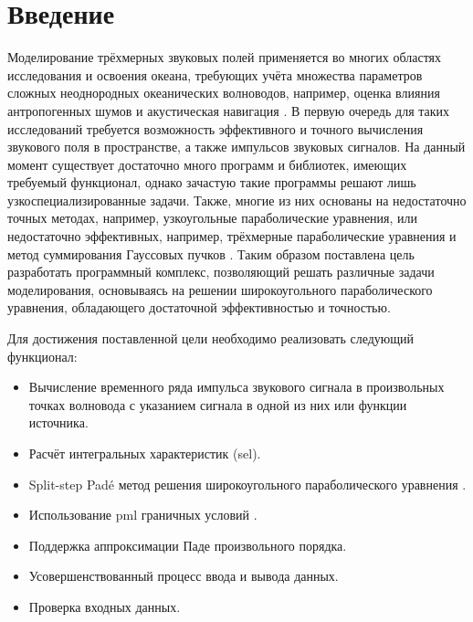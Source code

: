 \documentclass[../document.tex]{subfiles}
\begin{document}
	\section*{Введение}
	    \par Моделирование трёхмерных звуковых полей применяется во многих областях исследования и освоения океана, требующих учёта множества параметров сложных неоднородных океанических волноводов, например, оценка влияния антропогенных шумов и акустическая навигация \cite{noise1, noise2, navigation19, navigation20}. В первую очередь для таких исследований требуется возможность эффективного и точного вычисления звукового поля в пространстве, а также импульсов звуковых сигналов. На данный момент существует достаточно много программ и библиотек, имеющих требуемый функционал, однако зачастую такие программы решают лишь узкоспециализированные задачи. Также, многие из них основаны на недостаточно точных методах, например, узкоугольные параболические уравнения, или недостаточно эффективных, например, трёхмерные параболические уравнения \cite{isakson14,lin12,shtrum16,whoi,lyon} и метод суммирования Гауссовых пучков \cite{bellhop,traceo}. Таким образом поставлена цель разработать программный комплекс, позволяющий решать различные задачи моделирования, основываясь на решении широкоугольного параболического уравнения, обладающего достаточной эффективностью и точностью.
	    \par Для достижения поставленной цели необходимо реализовать следующий функционал:
	    	\begin{itemize}
	    		\item Вычисление временного ряда импульса звукового сигнала в произвольных точках волновода с указанием сигнала в одной из них или функции источника.
	    		\item Расчёт интегральных характеристик (\acrshort{sel}).
	    		\item Split-step Pad\'e метод решения широкоугольного параболического уравнения \cite{collins}.
                \item Использование \acrshort{pml} граничных условий \cite{berenger, levy, lu}.
	    		\item Поддержка аппроксимации Паде произвольного порядка.
	    		\item Усовершенствованный процесс ввода и вывода данных.
	    		\item Проверка входных данных.    		
	    	\end{itemize}
\end{document}
